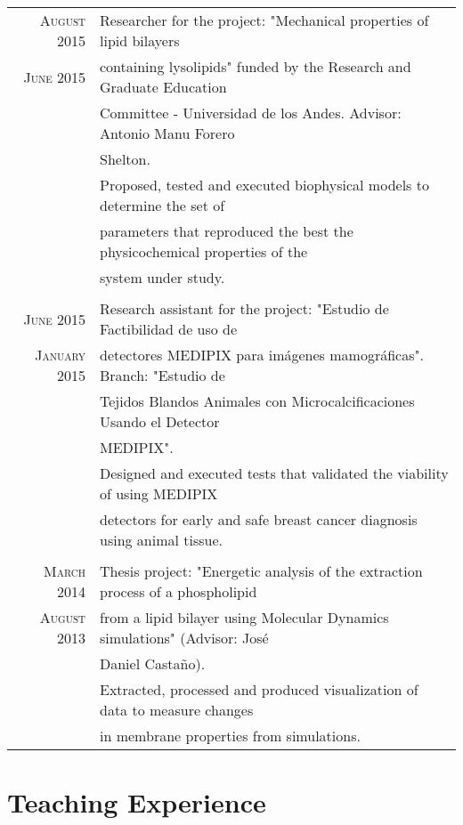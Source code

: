 \documentclass[a4paper,10pt]{article} %
\begin{document}
\begin{tabular}{rl}

\textsc{August 2015} & Researcher for the project: "Mechanical properties of lipid bilayers \\ 
\textsc{June 2015}   & containing lysolipids" funded by the Research and Graduate Education  \\ 
& Committee - Universidad de los Andes. Advisor: Antonio Manu Forero \\
& Shelton.  \\
& Proposed, tested and executed biophysical models to determine the set of \\ & parameters that reproduced the best the physicochemical properties of the \\& system under study. \\
\\ 
\textsc{June 2015} & Research assistant for the project: "Estudio de Factibilidad de uso de \\ 
\textsc{January 2015} & detectores MEDIPIX para imágenes mamográficas". Branch: "Estudio de \\ 
& Tejidos Blandos Animales con Microcalciﬁcaciones Usando el Detector \\
& MEDIPIX". \\
& Designed and executed tests that validated the viability of using MEDIPIX \\ & detectors for early and safe breast cancer diagnosis using animal tissue.  \\
\\
\textsc{March 2014} & Thesis project: "Energetic analysis of the  extraction process of a phospholipid\\
\textsc{August 2013} & from a lipid bilayer using Molecular Dynamics simulations" (Advisor: Jos\'e \\ & Daniel Casta\~no). \\
& Extracted, processed and produced visualization of data to measure changes \\ & in membrane properties from simulations.

\end{tabular}



\color{OrangeRed}
\section{Teaching Experience}
\color{black}
\end{document}
